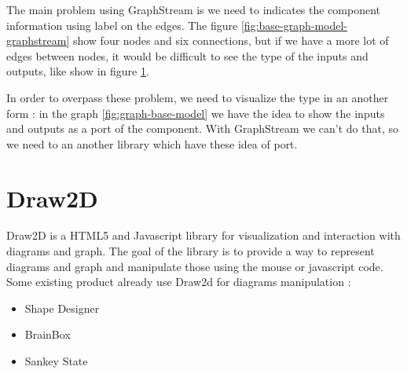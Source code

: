 The main problem using GraphStream is we need to indicates the component
information using label on the edges. The figure
\ref{fig:base-graph-model-graphstream} show four nodes and six connections, but
if we have a more lot of edges between nodes, it would be difficult to see the
type of the inputs and outputs, like show in figure
\ref{fig:graphstream-lot-of-edges}.

\begin{figure}[H]
  \centering
  \caption[Label on multiple edges using GraphStream]{}
  \label{fig:graphstream-lot-of-edges}
\end{figure}

In order to overpass these problem, we need to visualize the type in an another
form : in the graph \ref{fig:graph-base-model} we have the idea to show the
inputs and outputs as a port of the component. With GraphStream we can't do
that, so we need to an another library which have these idea of port.

\section{Draw2D}
\label{sec:Draw2D}

Draw2D is a HTML5 and Javascript library for visualization and interaction with
diagrams and graph\cite{draw2d}. The goal of the library is to provide a way to
represent diagrams and graph and manipulate those using the mouse or javascript
code. Some existing product already use Draw2d for diagrams manipulation :

\begin{itemize}
\item Shape Designer\cite{draw2d}
\item BrainBox\cite{draw2d}
\item Sankey State\cite{draw2d}
\end{itemize}

